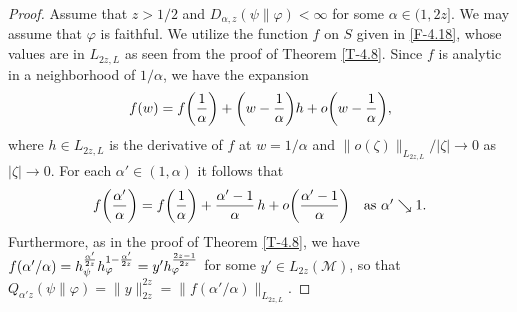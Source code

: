 \documentclass[12pt]{article}
\theoremstyle{definition}
\theoremstyle{remark}
\numberwithin{equation}{section}
\def\Me{\mathcal M}
\def\ffi{\varphi}
\begin{document}
\begin{proof}
Assume that $z>1/2$ and $D_{\alpha,z}(\psi\|\ffi)<\infty$ for some $\alpha\in(1,2z]$. We may assume that
$\ffi$ is faithful. We utilize the function $f$ on $S$ given in \eqref{F-4.18}, whose values are in $L_{2z,L}$
as seen from the proof of Theorem \ref{T-4.8}. Since $f$ is analytic in a neighborhood of $1/\alpha$, we have
the expansion
\[
f(w)=f\biggl({1\over\alpha}\biggr)+\biggl(w-{1\over\alpha}\biggr)h+o\biggl(w-{1\over\alpha}\biggr),
\]
where $h\in L_{2z,L}$ is the derivative of $f$ at $w=1/\alpha$ and $\|o(\zeta)\|_{L_{2z,L}}/|\zeta|\to0$ as
$|\zeta|\to0$. For each $\alpha'\in(1,\alpha)$ it follows that
\[
f\biggl({\alpha'\over\alpha}\biggr)=f\biggl({1\over\alpha}\biggr)+{\alpha'-1\over\alpha}\,h
+o\biggl({\alpha'-1\over\alpha}\biggr)\quad\mbox{as $\alpha'\searrow1$}.
\]
Furthermore, as in the proof of Theorem \ref{T-4.8}, we have
$f(\alpha'/\alpha)=h_\psi^{\alpha'\over2z}h_\ffi^{1-{\alpha'\over2z}}=y'h_\ffi^{2z-1\over2z}$ for some
$y'\in L_{2z}(\Me)$, so that $Q_{\alpha'z}(\psi\|\ffi)=\|y\|_{2z}^{2z}=\|f(\alpha'/\alpha)\|_{L_{2z,L}}$.


\end{proof}
\end{document}
